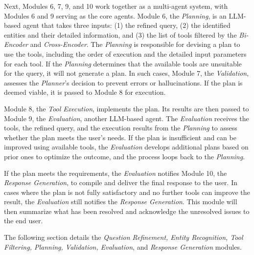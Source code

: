 \documentclass[runningheads]{llncs}
\begin{document}
Next, Modules 6, 7, 9, and 10 work together as a multi-agent system, with Modules 6 and 9 serving as the core agents. Module 6, the \textit{Planning}, is an LLM-based agent that takes three inputs: (1) the refined query, (2) the identified entities and their detailed information, and (3) the list of tools filtered by the \textit{Bi-Encoder} and \textit{Cross-Encoder}. The \textit{Planning} is responsible for devising a plan to use the tools, including the order of execution and the detailed input parameters for each tool. %
If the \textit{Planning} determines that the available tools are unsuitable for the query, it will not generate a plan. In such cases, Module 7, the \textit{Validation}, assesses the \textit{Planner}’s decision to prevent errors or hallucinations. If the plan is deemed viable, it is passed to Module 8 for execution.

Module 8, the \textit{Tool Execution}, implements the plan. Its results are then passed to Module 9, the \textit{Evaluation}, another LLM-based agent. The \textit{Evaluation} receives the tools, the refined query, and the execution results from the \textit{Planning} to assess whether the plan meets the user’s needs. If the plan is insufficient and can be improved using available tools, the \textit{Evaluation} develops additional plans based on prior ones to optimize the outcome, and the process loops back to the \textit{Planning}.

If the plan meets the requirements, the \textit{Evaluation} notifies Module 10, the \textit{Response Generation}, to compile and deliver the final response to the user. In cases where the plan is not fully satisfactory and no further tools can improve the result, the \textit{Evaluation} still notifies the \textit{Response Generation}. This module will then summarize what has been resolved and acknowledge the unresolved issues to the end user.

The following section details the \textit{Question Refinement, Entity Recognition, Tool Filtering, Planning, Validation, Evaluation}, and \textit{Response Generation} modules.

\end{document}
